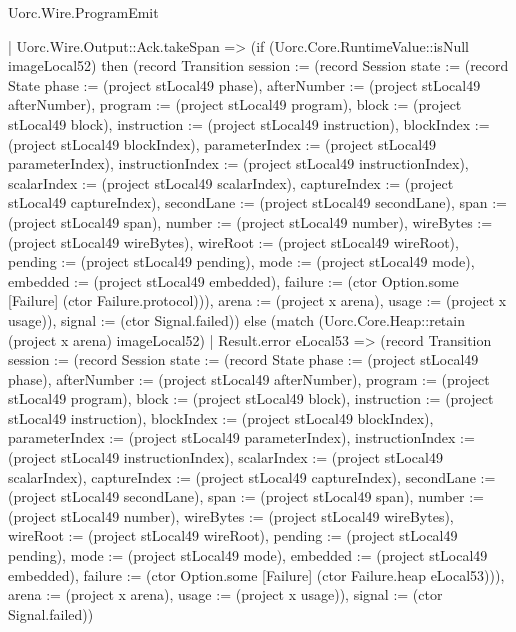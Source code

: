 \begin{lexlean}{Uorc.Wire.ProgramEmit}
\begin{semanticmodule}
{        | Uorc.Wire.Output::Ack.takeSpan => (if (Uorc.Core.RuntimeValue::isNull imageLocal52) then (record Transition {session := (record Session {state := (record State {phase := (project stLocal49 phase), afterNumber := (project stLocal49 afterNumber), program := (project stLocal49 program), block := (project stLocal49 block), instruction := (project stLocal49 instruction), blockIndex := (project stLocal49 blockIndex), parameterIndex := (project stLocal49 parameterIndex), instructionIndex := (project stLocal49 instructionIndex), scalarIndex := (project stLocal49 scalarIndex), captureIndex := (project stLocal49 captureIndex), secondLane := (project stLocal49 secondLane), span := (project stLocal49 span), number := (project stLocal49 number), wireBytes := (project stLocal49 wireBytes), wireRoot := (project stLocal49 wireRoot), pending := (project stLocal49 pending), mode := (project stLocal49 mode), embedded := (project stLocal49 embedded), failure := (ctor Option.some [Failure] (ctor Failure.protocol))}), arena := (project x arena), usage := (project x usage)}), signal := (ctor Signal.failed)}) else (match (Uorc.Core.Heap::retain (project x arena) imageLocal52)
          | Result.error eLocal53 => (record Transition {session := (record Session {state := (record State {phase := (project stLocal49 phase), afterNumber := (project stLocal49 afterNumber), program := (project stLocal49 program), block := (project stLocal49 block), instruction := (project stLocal49 instruction), blockIndex := (project stLocal49 blockIndex), parameterIndex := (project stLocal49 parameterIndex), instructionIndex := (project stLocal49 instructionIndex), scalarIndex := (project stLocal49 scalarIndex), captureIndex := (project stLocal49 captureIndex), secondLane := (project stLocal49 secondLane), span := (project stLocal49 span), number := (project stLocal49 number), wireBytes := (project stLocal49 wireBytes), wireRoot := (project stLocal49 wireRoot), pending := (project stLocal49 pending), mode := (project stLocal49 mode), embedded := (project stLocal49 embedded), failure := (ctor Option.some [Failure] (ctor Failure.heap eLocal53))}), arena := (project x arena), usage := (project x usage)}), signal := (ctor Signal.failed)})
}
\end{semanticmodule}
\end{lexlean}

